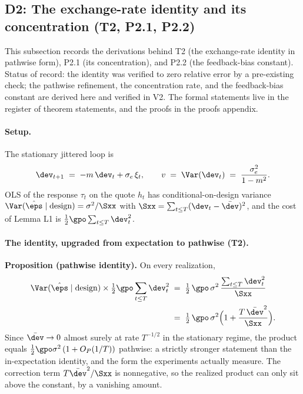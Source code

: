 \subsection*{D2: The exchange-rate identity and its concentration (T2, P2.1, P2.2)}

This subsection records the derivations behind T2 (the exchange-rate identity in
pathwise form), P2.1 (its concentration), and P2.2 (the feedback-bias constant).
Status of record: the identity was verified to zero relative error by a pre-existing
check; the pathwise refinement, the concentration rate, and the feedback-bias
constant are derived here and verified in V2. The formal statements live in the
register of theorem statements, and the proofs in the proofs appendix.

\paragraph{Setup.}
The stationary jittered loop is
\begin{equation*}
\dev_{t+1} \;=\; -m\,\dev_t + \sigma_e\,\xi_t,
\qquad
v \;=\; \Var(\dev_t) \;=\; \frac{\sigma_e^2}{1-m^2}.
\end{equation*}
OLS of the response $\tau_t$ on the quote $h_t$ has conditional-on-design variance
$\Var(\hat\eps \mid \mathrm{design}) = \sigma^2/\Sxx$ with
$\Sxx = \sum_{t\le T}(\dev_t-\bar{\dev})^2$, and the cost of Lemma L1 is
$\tfrac12\gpo\sum_{t\le T}\dev_t^2$.

\paragraph{The identity, upgraded from expectation to pathwise (T2).}
\textbf{Proposition (pathwise identity).} On every realization,
\begin{align*}
\Var(\hat\eps \mid \mathrm{design}) \times \tfrac12\gpo\sum_{t\le T}\dev_t^2
&\;=\; \tfrac12\,\gpo\,\sigma^2\,\frac{\sum_{t\le T}\dev_t^2}{\Sxx} \\
&\;=\; \tfrac12\,\gpo\,\sigma^2\Big(1+\frac{T\,\bar{\dev}^2}{\Sxx}\Big).
\end{align*}
Since $\bar{\dev}\to 0$ almost surely at rate $T^{-1/2}$ in the stationary regime,
the product equals $\tfrac12\gpo\sigma^2\,(1+O_P(1/T))$ pathwise: a strictly
stronger statement than the in-expectation identity, and the form the experiments
actually measure. The correction term $T\bar{\dev}^2/\Sxx$ is nonnegative, so the
realized product can only sit above the constant, by a vanishing amount.

